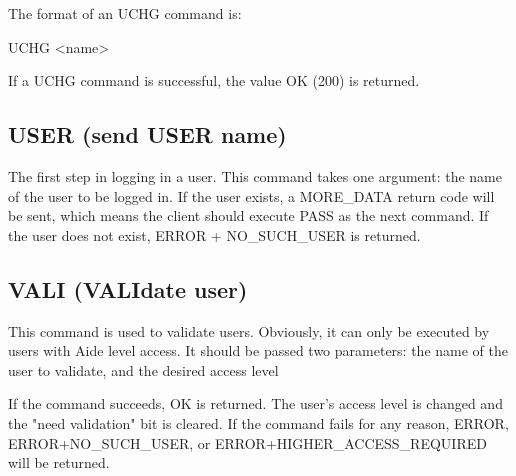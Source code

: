  The format of an UCHG command is:

 UCHG <name>

 If a UCHG command is successful, the value OK (200) is returned.



\subsection{USER (send USER name)}

 The first step in logging in a user.  This command takes one argument: the
name of the user to be logged in.  If the user exists, a MORE_DATA return
code will be sent, which means the client should execute PASS as the next
command.  If the user does not exist, ERROR + NO_SUCH_USER is returned.



\subsection{VALI (VALIdate user)}

 This command is used to validate users.  Obviously, it can only be executed
by users with Aide level access.  It should be passed two parameters: the
name of the user to validate, and the desired access level

 If the command succeeds, OK is returned.  The user's access level is changed
and the "need validation" bit is cleared.  If the command fails for any
reason, ERROR, ERROR+NO_SUCH_USER, or ERROR+HIGHER_ACCESS_REQUIRED will be
returned.



